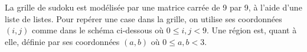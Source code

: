 \documentclass{magnolia}
\begin{document}

\bigskip

La grille de sudoku est modélisée par une matrice carrée de 9 par 9,
à l'aide d'une liste de listes. Pour repérer une case dans la grille, on utilise ses coordonnées $(i,j)$ comme dans le schéma ci-dessous où $0\leq i,j < 9$. Une région est, quant à elle, définie par ses coordonnées $(a,b)$ où $0\leq a,b<3$.
\end{document}
